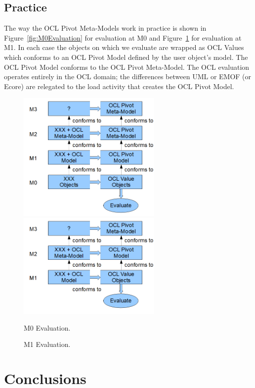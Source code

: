 \documentclass{eceasst}
\begin{document}
\subsection{Practice}

The way the OCL Pivot Meta-Models work in practice is shown in Figure~\ref{fig:M0Evaluation} for evaluation at M0 and Figure~\ref{fig:M1Evaluation} for evaluation at M1. In each case the objects on which we evaluate are wrapped as OCL Values which conforms to an OCL Pivot Model defined by the user object's model. The OCL Pivot Model conforms to the OCL Pivot Meta-Model. The OCL evaluation operates entirely in the OCL domain; the differences between UML or EMOF (or Ecore) are relegated to the load activity that creates the OCL Pivot Model.

\begin{figure}
  \begin{center}
    \includegraphics[width=2.75in]{M0Evaluation.png}
    \includegraphics[width=2.75in]{M1Evaluation.png}
  \end{center}
  \caption{M0 Evaluation.}
  \label{fig:M0Evaluation}
  \caption{M1 Evaluation.}
  \label{fig:M1Evaluation}
\end{figure}

\section{Conclusions}
\end{document}
